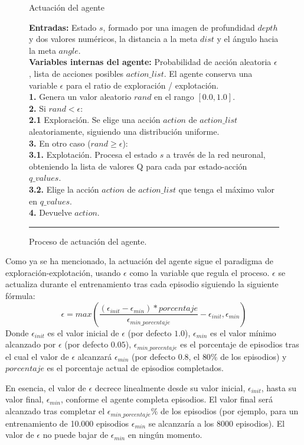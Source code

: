 \begin{figure}[h]
\begin{algorithm}[H]
\caption{Actuación del agente}
\textbf{Entradas:} Estado $s$, formado por una imagen de profundidad $depth$ y dos valores numéricos, la distancia a la meta $dist$ y el ángulo hacia la meta $angle$.\\
\textbf{Variables internas del agente:} Probabilidad de acción aleatoria $\epsilon$, lista de acciones posibles $action\_list$.
 El agente conserva una variable $\epsilon$ para el ratio de exploración / explotación.\\
\textbf{1.} Genera un valor aleatorio $rand$ en el rango $[0.0, 1.0]$.\\
\textbf{2.} Si $rand < \epsilon$:\\
\Indp \textbf{2.1} Exploración. Se elige una acción $action$ de $action\_list$ aleatoriamente, siguiendo una distribución uniforme.\\
\Indm \textbf{3.} En otro caso ($rand \geq \epsilon$):\\
\Indp \textbf{3.1.} Explotación. Procesa el estado $s$ a través de la red neuronal, obteniendo la lista de valores Q para cada par estado-acción $q\_values$.\\
\textbf{3.2.} Elige la acción $action$ de $action\_list$ que tenga el máximo valor en $q\_values$.\\
\Indm \textbf{4.} Devuelve $action$.
\end{algorithm}
\hrule
\caption{Proceso de actuación del agente.}
\label{alg:act}
\end{figure}

Como ya se ha mencionado, la actuación del agente sigue el paradigma de exploración-explotación, usando $\epsilon$ como la variable que regula el proceso. $\epsilon$ se actualiza durante el entrenamiento tras cada episodio siguiendo la siguiente fórmula:
\[\epsilon= max\left( \frac{(\epsilon_{init} - \epsilon_{min}) * porcentaje}{\epsilon_{min\_porcentaje}} - \epsilon_{init}, \epsilon_{min} \right)\]
Donde $\epsilon_{init}$ es el valor inicial de $\epsilon$ (por defecto $1.0$), $\epsilon_{min}$ es el valor mínimo alcanzado por $\epsilon$ (por defecto $0.05$), $\epsilon_{min\_porcentaje}$ es el porcentaje de episodios tras el cual el valor de $\epsilon$ alcanzará $\epsilon_{min}$ (por defecto $0.8$, el $80\%$ de los episodios) y $porcentaje$ es el porcentaje actual de episodios completados.

En esencia, el valor de $\epsilon$ decrece linealmente desde su valor inicial, $\epsilon_{init}$, hasta su valor final, $\epsilon_{min}$, conforme el agente completa episodios. El valor final será alcanzado tras completar el $\epsilon_{min\_porcentaje}\%$ de los episodios (por ejemplo, para un entrenamiento de 10.000 episodios $\epsilon_{min}$ se alcanzaría a los 8000 episodios). El valor de $\epsilon$ no puede bajar de $\epsilon_{min}$ en ningún momento.

